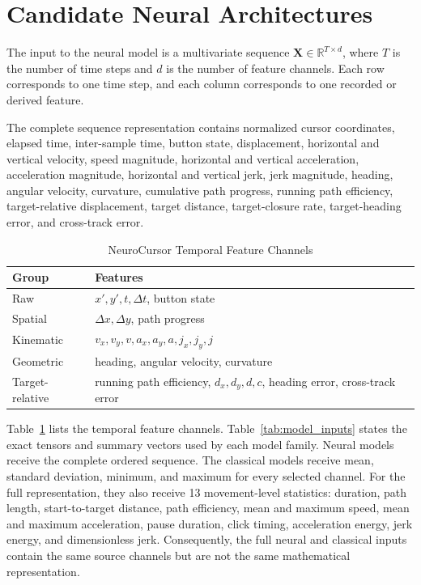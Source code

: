 \documentclass[conference]{IEEEtran}
\begin{document}
\section{Candidate Neural Architectures}

The input to the neural model is a multivariate sequence $\mathbf{X}\in\mathbb{R}^{T\times d}$, where $T$ is the number of time steps and $d$ is the number of feature channels. Each row corresponds to one time step, and each column corresponds to one recorded or derived feature.

The complete sequence representation contains normalized cursor coordinates, elapsed time, inter-sample time, button state, displacement, horizontal and vertical velocity, speed magnitude, horizontal and vertical acceleration, acceleration magnitude, horizontal and vertical jerk, jerk magnitude, heading, angular velocity, curvature, cumulative path progress, running path efficiency, target-relative displacement, target distance, target-closure rate, target-heading error, and cross-track error.

\begin{table}[t]
\centering
\caption{NeuroCursor Temporal Feature Channels}
\label{tab:sequence_features}
\begin{tabular}{@{}lp{5.0cm}@{}}
\toprule
\textbf{Group} & \textbf{Features} \\
\midrule
Raw &
$x',y',t,\Delta t$, button state \\
Spatial &
$\Delta x,\Delta y$, path progress \\
Kinematic &
$v_x,v_y,v,a_x,a_y,a,j_x,j_y,j$ \\
Geometric &
heading, angular velocity, curvature \\
Target-relative &
running path efficiency, $d_x,d_y,d,c$, heading error, cross-track error \\
\bottomrule
\end{tabular}
\end{table}

Table~\ref{tab:sequence_features} lists the temporal feature channels.
Table~\ref{tab:model_inputs} states the exact tensors and summary vectors used
by each model family. Neural models receive the complete ordered sequence. The
classical models receive mean, standard deviation, minimum, and maximum for
every selected channel. For the full representation, they also receive 13 movement-level
statistics: duration, path length, start-to-target distance, path efficiency,
mean and maximum speed, mean and maximum acceleration, pause duration, click
timing, acceleration energy, jerk energy, and dimensionless jerk. Consequently,
the full neural and classical inputs contain the same source channels but are
not the same mathematical representation.
\end{document}
